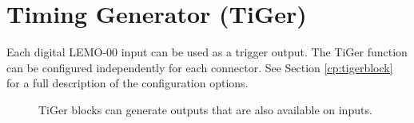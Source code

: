 \section{Timing Generator (TiGer)\label{cp:tiger}}
Each digital LEMO-00 input can be used as a  trigger output. 
The TiGer function can be configured independently for each connector. 
See Section \ref{cp:tigerblock} for a full description of the configuration options.
% 
\begin{figure}[ht]
    \begin{center}
        \caption{TiGer blocks can generate outputs that are also available on inputs.\label{fig:matrix}} 
    \end{center}
\end{figure}
%

